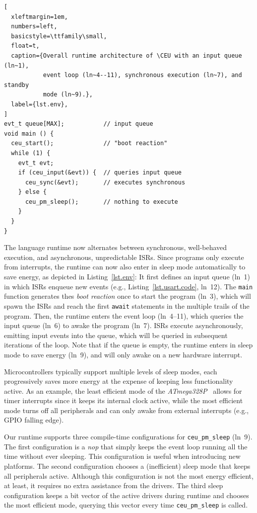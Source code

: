 \documentclass[sigplan,10pt,review,anonymous]{acmart}\settopmatter{printfolios=true,printccs=false,printacmref=false}
\newcommand{\CEU}{\textsc{C\'{e}u}\xspace}
\newcommand{\code}[1] {{\small{\texttt{#1}}}}
\begin{document}
\begin{lstlisting}[
  xleftmargin=1em,
  numbers=left,
  basicstyle=\ttfamily\small,
  float=t,
  caption={Overall runtime architecture of \CEU with an input queue (ln~1),
           event loop (ln~4--11), synchronous execution (ln~7), and standby
           mode (ln~9).},
  label={lst.env},
]
evt_t queue[MAX];           // input queue
void main () {
  ceu_start();              // "boot reaction"
  while (1) {
    evt_t evt;
    if (ceu_input(&evt)) {  // queries input queue
      ceu_sync(&evt);       // executes synchronous
    } else {
      ceu_pm_sleep();       // nothing to execute
    }
  }
}
\end{lstlisting}

The language runtime now
alternates between synchronous, well-behaved execution, and asynchronous,
unpredictable ISRs.
%
Since programs only execute from interrupts, the runtime can now also enter in
sleep mode automatically to save energy, as depicted in Listing~\ref{lst.env}:
%
It first defines an input queue (ln~1) in which ISRs enqueue new events (e.g.,
Listing~\ref{lst.usart.code}, ln~12).
%
The \code{main} function generates thes \emph{boot reaction} once to start the
program (ln~3), which will spawn the ISRs and reach the first \code{await}
statements in the multiple trails of the program.
%
Then, the runtime enters the event loop (ln~4--11), which queries the input
queue (ln~6) to awake the program (ln~7).
%
ISRs execute asynchronously, emitting input events into the queue, which will
be queried in subsequent iterations of the loop.
%
Note that if the queue is empty, the runtime enters in sleep mode to save
energy (ln~9), and will only awake on a new hardware interrupt.

Microcontrollers typically support multiple levels of sleep modes, each
progressively saves more energy at the expense of keeping less functionality
active.
%
As an example, the least efficient mode of the
\emph{ATmega328P}~\cite{arduino.atmega328p} allows for
timer interrupts since it keeps its internal clock active, while the most
efficient mode turns off all peripherals and can only awake from external
interrupts (e.g., GPIO falling edge).

Our runtime supports three compile-time configurations for \code{ceu\_pm\_sleep}
(ln~9).
%
The first configuration is a \emph{nop} that simply keeps the event loop
running all the time without ever sleeping.
This configuration is useful when introducing new platforms.
%
The second configuration chooses a (inefficient) sleep mode that keeps all
peripherals active.
Although this configuration is not the most energy efficient, at least, it
requires no extra assistance from the drivers.
%
The third sleep configuration keeps a bit vector of the active drivers during runtime
and chooses the most efficient mode, querying this vector every time
\code{ceu\_pm\_sleep} is called.
\end{document}

